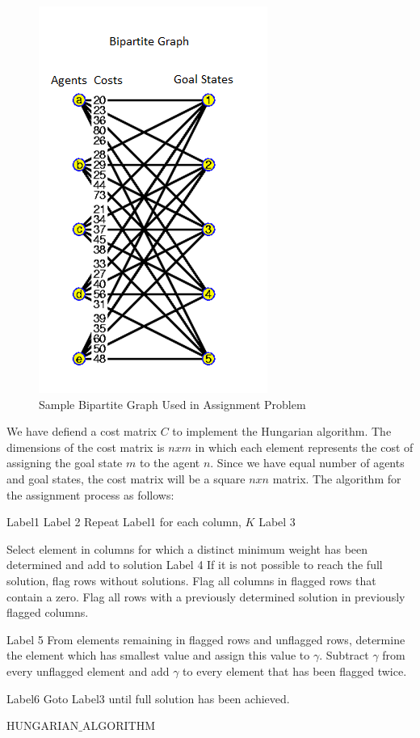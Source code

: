 \begin{figure}[H]
\centering
\includegraphics[width=.4\textwidth]{bipartite}
\caption{Sample Bipartite Graph Used in Assignment Problem \cite{102}}
\end{figure}

We have defiend a cost matrix  $C$ to implement the Hungarian algorithm. The dimensions of the cost matrix is $nxm$ in which each element represents the cost of assigning the goal state $m$ to the agent $n$.  Since we have equal number of agents and goal states, the cost matrix will be a square $nxn$ matrix.  The algorithm for the assignment process as follows:
	
\begin{algorithm}[H]
Label1  \;
Label 2  \; 
{Repeat Label1 for each column, $K$}
Label 3  \; 

Select element in columns for which a distinct minimum weight has been determined and add to solution \newline
Label 4 \;
If it is not possible to reach the full solution, flag rows without solutions. Flag all columns in flagged rows that contain a zero. Flag all rows with a previously determined solution in previously flagged columns.
     
Label 5 \;
From elements remaining in flagged rows and unflagged rows, determine the element which has smallest value and assign this value to $\gamma$. Subtract $\gamma$  from every unflagged element and add  $\gamma$ to every element that has been flagged twice.
     
Label6 \;
Goto Label3 until full solution has been achieved. \newline    
\caption{HUNGARIAN$\_$ALGORITHM}
\end{algorithm}

